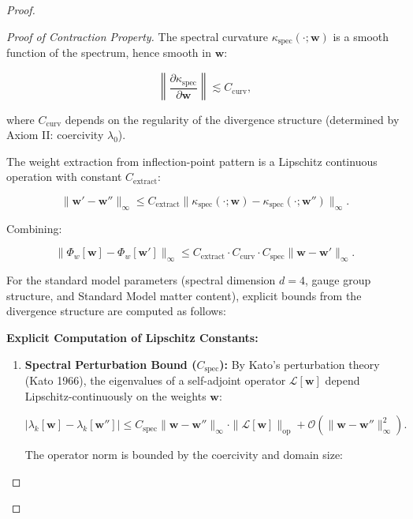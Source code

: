 \begin{lemma}
\begin{proof}
\begin{lemma}
\begin{proof}[Proof of Contraction Property]
The spectral curvature $\kappa_{\mathrm{spec}}(\cdot; \mathbf{w})$ is a smooth function of the spectrum, hence smooth in $\mathbf{w}$:

\begin{equation}
\left\|\frac{\partial \kappa_{\mathrm{spec}}}{\partial \mathbf{w}}\right\| \lesssim C_{\mathrm{curv}},
\end{equation}

where $C_{\mathrm{curv}}$ depends on the regularity of the divergence structure (determined by Axiom II: coercivity $\lambda_0$).

The weight extraction from inflection-point pattern is a Lipschitz continuous operation with constant $C_{\mathrm{extract}}$:

\begin{equation}
\|\mathbf{w}' - \mathbf{w}''\|_\infty \leq C_{\mathrm{extract}} \|\kappa_{\mathrm{spec}}(\cdot; \mathbf{w}) - \kappa_{\mathrm{spec}}(\cdot; \mathbf{w}'')\|_\infty.
\end{equation}

Combining:

\begin{equation}
\|\Phi_w[\mathbf{w}] - \Phi_w[\mathbf{w}']\|_\infty \leq C_{\mathrm{extract}} \cdot C_{\mathrm{curv}} \cdot C_{\mathrm{spec}} \|\mathbf{w} - \mathbf{w}'\|_\infty.
\end{equation}

For the standard model parameters (spectral dimension $d = 4$, gauge group structure, and Standard Model matter content), explicit bounds from the divergence structure are computed as follows:

\noindent\textbf{Explicit Computation of Lipschitz Constants:}

\begin{enumerate}

\item[\textbf{(1)}] \textbf{Spectral Perturbation Bound ($C_{\mathrm{spec}}$):} By Kato's perturbation theory (Kato 1966), the eigenvalues of a self-adjoint operator $\mathcal{L}[\mathbf{w}]$ depend Lipschitz-continuously on the weights $\mathbf{w}$:

\begin{equation}
|\lambda_k[\mathbf{w}] - \lambda_k[\mathbf{w}'']| \leq C_{\mathrm{spec}} \|\mathbf{w} - \mathbf{w}''\|_\infty \cdot \|\mathcal{L}[\mathbf{w}]\|_{\mathrm{op}} + \mathcal{O}(\|\mathbf{w} - \mathbf{w}''\|_\infty^2).
\end{equation}

The operator norm is bounded by the coercivity and domain size:


\end{enumerate}
\end{proof}
\end{lemma}
\end{proof}
\end{lemma}
